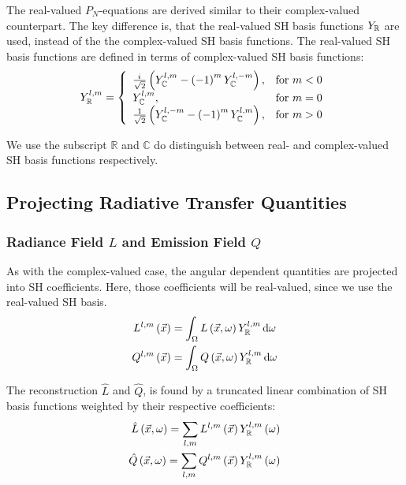 \documentclass[10pt]{scrartcl}
\begin{document}
The real-valued $P_N$-equations are derived similar to their complex-valued counterpart. The key difference is, that the real-valued SH basis functions $Y_{\mathbb{R}}$ are used, instead of the the complex-valued SH basis functions. The real-valued SH basis functions are defined in terms of complex-valued SH basis functions:
\begin{align}
\label{eq:real_sh_basis}
Y_{\mathbb{R}}^{l,m}=
\left\{
\begin{array}{lr}
\frac{{i\mkern1mu}}{\sqrt{2}}\left(Y_{\mathbb{C}}^{l,m}-\left(-1\right)^mY_{\mathbb{C}}^{l,-m}\right), & \text{for } m < 0\\
Y_{\mathbb{C}}^{l,m}, & \text{for } m = 0\\
\frac{1}{\sqrt{2}}\left(Y_{\mathbb{C}}^{l,-m}-\left(-1\right)^mY_{\mathbb{C}}^{l,m}\right), & \text{for } m > 0
\end{array}
\right.
\end{align}

We use the subscript $\mathbb{R}$ and $\mathbb{C}$ do distinguish between real- and complex-valued SH basis functions respectively.

\subsection{Projecting Radiative Transfer Quantities}

\subsubsection{Radiance Field $L$ and Emission Field $Q$}

As with the complex-valued case, the angular dependent quantities are projected into SH coefficients. Here, those coefficients will be real-valued, since we use the real-valued SH basis.
\begin{align}
L^{l,m}\left(\vec{x}\right)
&=
\int_\Omega{L\left(\vec{x}, \omega\right)Y_{\mathbb{R}}^{l,m}\,\mathrm{d}\omega}\nonumber\\
Q^{l,m}\left(\vec{x}\right)
&=
\int_\Omega{Q\left(\vec{x}, \omega\right)Y_{\mathbb{R}}^{l,m}\,\mathrm{d}\omega}\nonumber
\end{align} 

The reconstruction $\hat{L}$ and $\hat{Q}$, is found by a truncated linear combination of SH basis functions weighted by their respective coefficients:
\begin{align}
\label{eq:real_sh_exp_L}
\hat{L}\left(\vec{x}, \omega\right) =
\sum_{l,m}
{
L^{l,m}\left(\vec{x}\right)Y_{\mathbb{R}}^{l,m}\left(\omega\right)
}\nonumber\\
\hat{Q}\left(\vec{x}, \omega\right) =
\sum_{l,m}
{
Q^{l,m}\left(\vec{x}\right)Y_{\mathbb{R}}^{l,m}\left(\omega\right)
}
\end{align}
\end{document}
